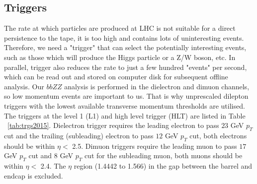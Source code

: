 \subsection{Triggers\label{sec:triggers}}

The rate at which particles are produced at LHC is not suitable for a direct persistence to the tape, it is too high and contains lots of uninteresting events. Therefore, we need a "trigger" that can select the potentially interesting events, such as those which will produce the Higgs particle or a Z/W boson, etc. In parallel, trigger also reduces the rate to just a few hundred "events" per second, which can be read out and stored on computer disk for subsequent offline analysis. Our $bbZZ$ analysis is performed in the dielectron and dimuon channels, so low momentum events are important to us. That is why unprescaled dilepton triggers with the lowest available transverse momentum thresholds are utilised. The triggers at the level 1 (L1) and high level trigger (HLT) are listed in Table ~\ref{tab:trgs2015}. Dielectron trigger requires the leading electron to pass $23$ GeV $p_{T}$ cut and the trailing (subleading) electron to pass $12$ GeV $p_{T}$ cut, both electrons should be within $\eta < $ 2.5. Dimuon triggers require the leading muon to pass $17$ GeV $p_{T}$ cut and $8$ GeV $p_{T}$ cut for the subleading muon, both muons should be within $\eta < $  2.4. The $\eta$ region (1.4442 to 1.566) in the gap between the barrel and endcap is excluded.



